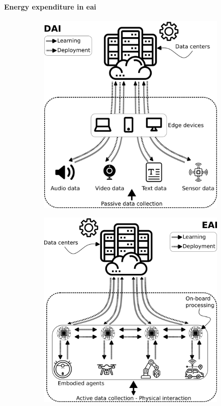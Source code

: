 \documentclass[12pt]{article}
\begin{document}
\paragraph*{Energy expenditure in \ac{eai}}
\begin{figure}[t!]
	\centering
	\hspace*{\fill}
	\begin{subfigure}[t]{0.45\textwidth}
		\subcaption{}
		\includegraphics[width= \textwidth]{cai_concept.png} \label{fig:cai}
	\end{subfigure}
	\hfill
	\begin{subfigure}[t]{0.45\textwidth}
		\subcaption{}
		\includegraphics[width= \textwidth]{eai_concept.png} \label{fig:eai}

\end{subfigure}
\end{figure}
\end{document}
